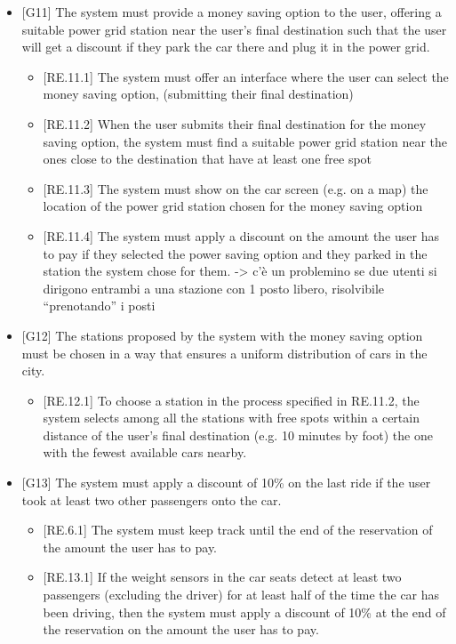 \documentclass[english]{article}
\begin{document}
\begin{itemize}
\item{[G11] The system must provide a money saving option to the user, offering a suitable power grid station near the user’s final destination such that the user will get a discount if they park the car there and plug it in the power grid.
\begin{itemize}
	\item{[RE.11.1] The system must offer an interface where the user can select the money saving option, (submitting their final destination)}
	\item{[RE.11.2] When the user submits their final destination for the money saving option, the system must find a suitable power grid station near the ones close to the destination that have at least one free spot}
	\item{[RE.11.3] The system must show on the car screen (e.g. on a map) the location of the power grid station chosen for the money saving option}
	\item{[RE.11.4] The system must apply a discount on the amount the user has to pay if they selected the power saving option and they parked in the station the system chose for them.}
-> c’è un problemino se due utenti si dirigono entrambi a una stazione con 1 posto libero, risolvibile “prenotando” i posti
\end{itemize}
}

\item{[G12] The stations proposed by the system with the money saving option must be chosen in a way that ensures a uniform distribution of cars in the city.
\begin{itemize}
	\item{[RE.12.1] To choose a station in the process specified in RE.11.2, the system selects among all the stations with free spots within a certain distance of the user’s final destination (e.g. 10 minutes by foot) the one with the fewest available cars nearby.}
\end{itemize}
}

\item{[G13] The system must apply a discount of 10\% on the last ride if the user took at least two other passengers onto the car.
\begin{itemize}
	\item{[RE.6.1] The system must keep track until the end of the reservation of the amount the user has to pay.}
	\item{[RE.13.1] If the weight sensors in the car seats detect at least two passengers (excluding the driver) for at least half of the time the car has been driving, then the system must apply a discount of 10\% at the end of the reservation on the amount the user has to pay.}
\end{itemize}
}


\end{itemize}
\end{document}
